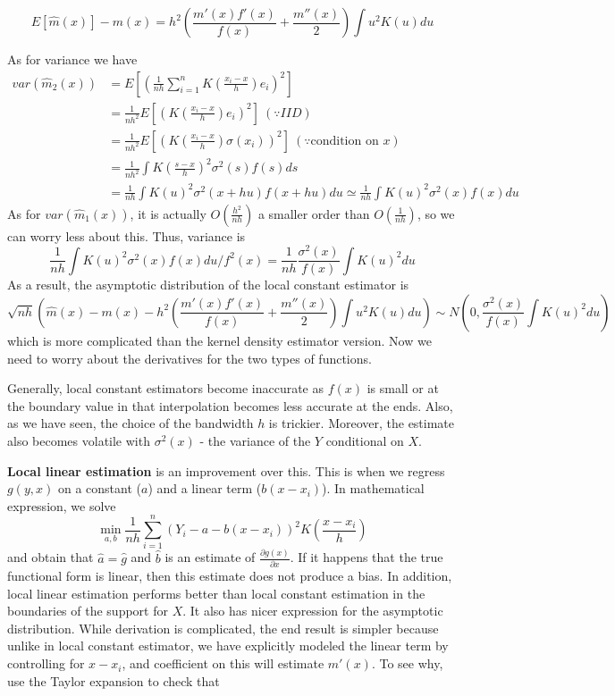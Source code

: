 \documentclass[12pt]{article}
\theoremstyle{definition}
\theoremstyle{property}
\theoremstyle{assumption}
\theoremstyle{example}
\theoremstyle{comment}
\begin{document}
\[
E[\hat{m}(x)]-m(x) = h^2 \left( \frac{m'(x)f'(x)}{f(x)} + \frac{m''(x)}{2} \right)\int u^2K(u)du
\]
\par
As for variance we have
\footnotesize{\[\begin{aligned}
var(\hat{m}_2(x))&=E\left[\left(\frac{1}{nh}\sum_{i=1}^n K\left(\frac{x_i-x}{h}\right)e_i \right)^2\right]\\
&=\frac{1}{nh^2}E\left[\left(K\left(\frac{x_i-x}{h}\right)e_i \right)^2\right] \ (\because IID)\\
&=\frac{1}{nh^2}E\left[\left(K\left(\frac{x_i-x}{h}\right)\sigma(x_i) \right)^2\right] \ (\because \text{condition on }x)\\
&=\frac{1}{nh^2}\int K\left(\frac{s-x}{h}\right)^2\sigma^2(s)f(s)ds \\
&=\frac{1}{nh}\int K\left(u\right)^2\sigma^2(x+hu)f(x+hu)du \simeq\frac{1}{nh}\int K\left(u\right)^2\sigma^2(x)f(x)du
\end{aligned}\]}\normalsize
As for $var(\hat{m}_1(x))$, it is actually $O\left(\frac{h^2}{nh}\right)$ a smaller order than $O\left(\frac{1}{nh}\right)$, so we can worry less about this. Thus, variance is
\[
\frac{1}{nh}\int K\left(u\right)^2\sigma^2(x)f(x)du / f^2(x) = \frac{1}{nh}\frac{\sigma^2(x)}{f(x)}\int K\left(u\right)^2du 
\]
As a result, the asymptotic distribution of the local constant estimator is
\[
\sqrt{nh}\left(\hat{m}(x)-m(x)-h^2 \left( \frac{m'(x)f'(x)}{f(x)} + \frac{m''(x)}{2} \right)\int u^2K(u)du\right)\sim N\left(0, \frac{\sigma^2(x)}{f(x)}\int K\left(u\right)^2du \right)
\]
which is more complicated than the kernel density estimator version. Now we need to worry about the derivatives for the two types of functions. 
\par
Generally, local constant estimators become inaccurate as $f(x)$ is small or at the boundary value in that interpolation becomes less accurate at the ends. Also, as we have seen, the choice of the bandwidth $h$ is trickier. Moreover, the estimate also becomes volatile with $\sigma^2(x)$ - the variance of the $Y$ conditional on $X$. 
\par
 \textbf{Local linear estimation} is an improvement over this. This is when we regress $g(y,x)$ on a constant ($a$) and a linear term ($b(x-x_i)$). In mathematical expression, we solve
 \[
 \min_{a,b}\frac{1}{nh}\sum_{i=1}^n(Y_i-a-b(x-x_i))^2K\left(\frac{x-x_i}{h}\right)
 \]
 and obtain that $\hat{a}=\hat{g}$ and $\hat{b}$ is an estimate of $\frac{\partial g(x)}{\partial x}$. If it happens that the true functional form is linear, then this estimate does not produce a bias. In addition, local linear estimation performs better than local constant estimation in the boundaries of the support for $X$. It also has nicer expression for the asymptotic distribution. While derivation is complicated, the end result is simpler because unlike in local constant estimator, we have explicitly modeled the linear term by controlling for $x-x_i$, and coefficient on this will estimate $m'(x)$. To see why, use the Taylor expansion to check that
\end{document}
